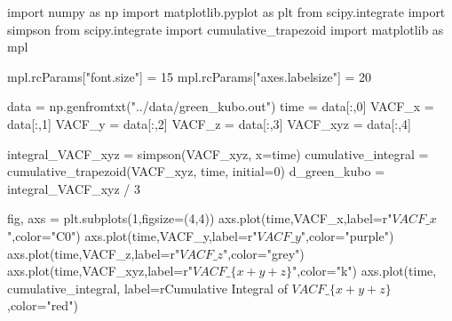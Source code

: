 \documentclass[
  letterpaper,
  DIV=11,
  numbers=noendperiod]{scrreprt}
\newenvironment{Shaded}{\begin{snugshade}}{\end{snugshade}}
\newcommand{\DecValTok}[1]{\textcolor[rgb]{0.68,0.00,0.00}{#1}}
\newcommand{\ImportTok}[1]{\textcolor[rgb]{0.00,0.46,0.62}{#1}}
\newcommand{\NormalTok}[1]{\textcolor[rgb]{0.00,0.23,0.31}{#1}}
\newcommand{\OperatorTok}[1]{\textcolor[rgb]{0.37,0.37,0.37}{#1}}
\newcommand{\StringTok}[1]{\textcolor[rgb]{0.13,0.47,0.30}{#1}}
\newcommand{\VerbatimStringTok}[1]{\textcolor[rgb]{0.13,0.47,0.30}{#1}}
\begin{document}
\begin{Shaded}
\begin{Highlighting}[]
\ImportTok{import}\NormalTok{ numpy }\ImportTok{as}\NormalTok{ np}
\ImportTok{import}\NormalTok{ matplotlib.pyplot }\ImportTok{as}\NormalTok{ plt}
\ImportTok{from}\NormalTok{ scipy.integrate }\ImportTok{import}\NormalTok{ simpson}
\ImportTok{from}\NormalTok{ scipy.integrate }\ImportTok{import}\NormalTok{ cumulative\_trapezoid}
\ImportTok{import}\NormalTok{ matplotlib }\ImportTok{as}\NormalTok{ mpl}

\NormalTok{mpl.rcParams[}\StringTok{"font.size"}\NormalTok{] }\OperatorTok{=} \DecValTok{15}
\NormalTok{mpl.rcParams[}\StringTok{"axes.labelsize"}\NormalTok{] }\OperatorTok{=} \DecValTok{20}

\NormalTok{data }\OperatorTok{=}\NormalTok{ np.genfromtxt(}\StringTok{"../data/green\_kubo.out"}\NormalTok{)}
\NormalTok{time }\OperatorTok{=}\NormalTok{ data[:,}\DecValTok{0}\NormalTok{]}
\NormalTok{VACF\_x }\OperatorTok{=}\NormalTok{ data[:,}\DecValTok{1}\NormalTok{]}
\NormalTok{VACF\_y }\OperatorTok{=}\NormalTok{ data[:,}\DecValTok{2}\NormalTok{]}
\NormalTok{VACF\_z }\OperatorTok{=}\NormalTok{ data[:,}\DecValTok{3}\NormalTok{]}
\NormalTok{VACF\_xyz }\OperatorTok{=}\NormalTok{ data[:,}\DecValTok{4}\NormalTok{]}


\NormalTok{integral\_VACF\_xyz }\OperatorTok{=}\NormalTok{ simpson(VACF\_xyz, x}\OperatorTok{=}\NormalTok{time)}
\NormalTok{cumulative\_integral }\OperatorTok{=}\NormalTok{ cumulative\_trapezoid(VACF\_xyz, time, initial}\OperatorTok{=}\DecValTok{0}\NormalTok{)}
\NormalTok{d\_green\_kubo }\OperatorTok{=}\NormalTok{ integral\_VACF\_xyz }\OperatorTok{/} \DecValTok{3}

\NormalTok{fig, axs }\OperatorTok{=}\NormalTok{ plt.subplots(}\DecValTok{1}\NormalTok{,figsize}\OperatorTok{=}\NormalTok{(}\DecValTok{4}\NormalTok{,}\DecValTok{4}\NormalTok{))}
\NormalTok{axs.plot(time,VACF\_x,label}\OperatorTok{=}\VerbatimStringTok{r"$VACF\_x$"}\NormalTok{,color}\OperatorTok{=}\StringTok{"C0"}\NormalTok{)}
\NormalTok{axs.plot(time,VACF\_y,label}\OperatorTok{=}\VerbatimStringTok{r"$VACF\_y$"}\NormalTok{,color}\OperatorTok{=}\StringTok{"purple"}\NormalTok{)}
\NormalTok{axs.plot(time,VACF\_z,label}\OperatorTok{=}\VerbatimStringTok{r"$VACF\_z$"}\NormalTok{,color}\OperatorTok{=}\StringTok{"grey"}\NormalTok{)}
\NormalTok{axs.plot(time,VACF\_xyz,label}\OperatorTok{=}\VerbatimStringTok{r"$VACF\_\{x+y+z\}$"}\NormalTok{,color}\OperatorTok{=}\StringTok{"k"}\NormalTok{)}
\NormalTok{axs.plot(time, cumulative\_integral, label}\OperatorTok{=}\VerbatimStringTok{r\textquotesingle{}Cumulative Integral of $VACF\_\{x+y+z\}$\textquotesingle{}}\NormalTok{,color}\OperatorTok{=}\StringTok{"red"}\NormalTok{)}


\end{Highlighting}
\end{Shaded}
\end{document}
